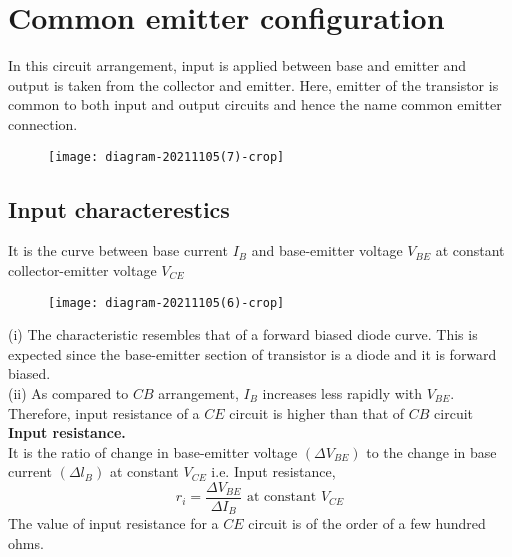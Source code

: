  \section{Common emitter configuration}
 In this circuit arrangement, input is applied between base and emitter and output is taken from the collector and emitter. Here, emitter of the transistor is common to both input and output circuits and hence the name common emitter connection.\\
 \begin{figure}[H]
 	\centering
 	\texttt{[image: diagram-20211105(7)-crop]}
 	\caption{}
 	\label{}
 \end{figure}
 \subsection{Input characterestics}
  It is the curve between base current $I_{B}$ and base-emitter voltage $V_{B E}$ at constant collector-emitter voltage $V_{C E}$
  \begin{figure}[H]
  	\centering
  	\texttt{[image: diagram-20211105(6)-crop]}
  	\caption{}
  	\label{}
  \end{figure}
  (i) The characteristic resembles that of a forward biased diode curve. This is expected since the base-emitter section of transistor is a diode and it is forward biased.\\
  (ii) As compared to $C B$ arrangement, $I_{B}$ increases less rapidly with $V_{B E}$. Therefore, input resistance of a $C E$ circuit is higher than that of $C B$ circuit\\
   \textbf{Input resistance.}\\
    It is the ratio of change in base-emitter voltage $\left(\Delta V_{B E}\right)$ to the change in base current $\left(\Delta l_{B}\right)$ at constant $V_{C E}$ i.e.
   Input resistance,
   $$
   r_{i}=\frac{\Delta V_{B E}}{\Delta I_{B}} \text { at constant } V_{C E}
   $$
   The value of input resistance for a $C E$ circuit is of the order of a few hundred ohms.
